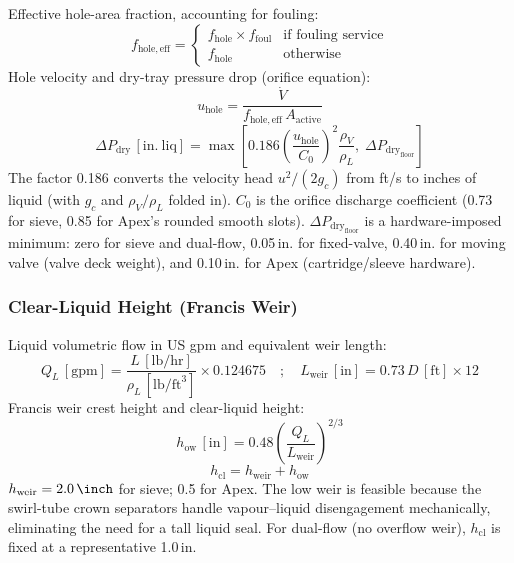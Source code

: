 \documentclass[11pt,letterpaper]{article}
\newcommand{\dpd}{\Delta P_{\mathrm{dry}}}
\newcommand{\how}{h_{\mathrm{ow}}}
\newcommand{\hcl}{h_{\mathrm{cl}}}
\begin{document}
Effective hole-area fraction, accounting for fouling:
\begin{equation}
  f_{\mathrm{hole,eff}} =
  \begin{cases}
    f_{\mathrm{hole}} \times f_{\mathrm{foul}} & \text{if fouling service}\\
    f_{\mathrm{hole}}                           & \text{otherwise}
  \end{cases}
\end{equation}
Hole velocity and dry-tray pressure drop (orifice equation):
\begin{equation}
  u_{\mathrm{hole}} = \frac{\dot{V}}{f_{\mathrm{hole,eff}}\,A_{\mathrm{active}}}
  \label{eq:uhole}
\end{equation}
\begin{equation}
  \dpd\,[\mathrm{in.\ liq}] = \max\!\left[
    0.186\left(\frac{u_{\mathrm{hole}}}{C_0}\right)^{\!2}
    \frac{\rho_V}{\rho_L},\;
    \dpd_{\mathrm{floor}}
  \right]
  \label{eq:dpdry}
\end{equation}
The factor 0.186 converts the velocity head $u^2/(2g_c)$ from ft/s to
inches of liquid (with $g_c$ and $\rho_V/\rho_L$ folded in).  $C_0$ is the
orifice discharge coefficient (0.73 for sieve, 0.85 for Apex's rounded
smooth slots).  $\dpd_{\mathrm{floor}}$ is a hardware-imposed minimum:
zero for sieve and dual-flow, 0.05\,in. for fixed-valve, 0.40\,in. for
moving valve (valve deck weight), and 0.10\,in. for Apex (cartridge/sleeve
hardware).

\subsubsection{Clear-Liquid Height (Francis Weir)}
\label{sec:francis}

Liquid volumetric flow in US gpm and equivalent weir length:
\begin{equation}
  Q_L\,[\mathrm{gpm}] = \frac{L\,[\mathrm{lb/hr}]}{\rho_L\,[\mathrm{lb/ft}^3]}
    \times 0.124675
  \quad;\quad
  L_{\mathrm{weir}}\,[\mathrm{in}] = 0.73\,D\,[\mathrm{ft}]\times 12
  \label{eq:qlgpm}
\end{equation}
Francis weir crest height and clear-liquid height:
\begin{equation}
  \how\,[\mathrm{in}] = 0.48\left(\frac{Q_L}{L_{\mathrm{weir}}}\right)^{2/3}
  \label{eq:how}
\end{equation}
\begin{equation}
  \hcl = h_{\mathrm{weir}} + \how
  \label{eq:hcl}
\end{equation}
$h_{\mathrm{weir}} = \SI{2.0}{\inch}$ for sieve; \SI{0.5}{\inch} for Apex.
The low weir is feasible because the swirl-tube crown separators handle
vapour--liquid disengagement mechanically, eliminating the need for a tall
liquid seal.  For dual-flow (no overflow weir), $\hcl$ is fixed at a
representative 1.0\,in.
\end{document}

